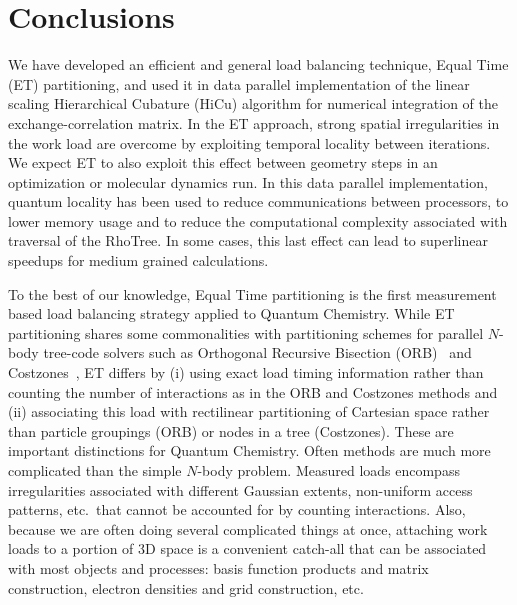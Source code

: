 \commentoutA{\documentclass[prl,aps,twocolumn,showpacs,twocolumngrid,superbib]{revtex4}}
\begin{document}
\section{Conclusions}
\label{sec:conclusions}

We have developed an efficient and general load balancing technique,
Equal Time (ET) partitioning, and used it in data parallel
implementation of the linear scaling Hierarchical Cubature (HiCu)
algorithm for numerical integration of the exchange-correlation
matrix.  In the ET approach, strong spatial irregularities in the work
load are overcome by exploiting temporal locality between iterations.
We expect ET to also exploit this effect between geometry steps in an
optimization or molecular dynamics run.  In this data parallel
implementation, quantum locality has been used to reduce
communications between processors, to lower memory usage and to reduce
the computational complexity associated with traversal of the RhoTree.
In some cases, this last effect can lead to superlinear speedups for
medium grained calculations.

To the best of our knowledge, Equal Time partitioning is the first
measurement based load balancing strategy applied to Quantum
Chemistry.  While ET partitioning shares some commonalities with
partitioning schemes for parallel $N$-body tree-code solvers such as
Orthogonal Recursive Bisection (ORB)~\cite{warren:92_article} and
Costzones~\cite{Singh93}, ET differs by (i) using exact load timing
information rather than counting the number of interactions as in the
ORB and Costzones methods and (ii) associating this load with
rectilinear partitioning of Cartesian space rather than particle
groupings (ORB) or nodes in a tree (Costzones).  These are important
distinctions for Quantum Chemistry.  Often methods are much more
complicated than the simple $N$-body problem.  Measured loads
encompass irregularities associated with different Gaussian extents,
non-uniform access patterns, etc.~that cannot be accounted for by
counting interactions.  Also, because we are often doing several
complicated things at once, attaching work loads to a portion of
3D space is a convenient catch-all that can be associated with most
objects and processes: basis function products and matrix construction,
electron densities and grid construction, etc.  
\end{document}
